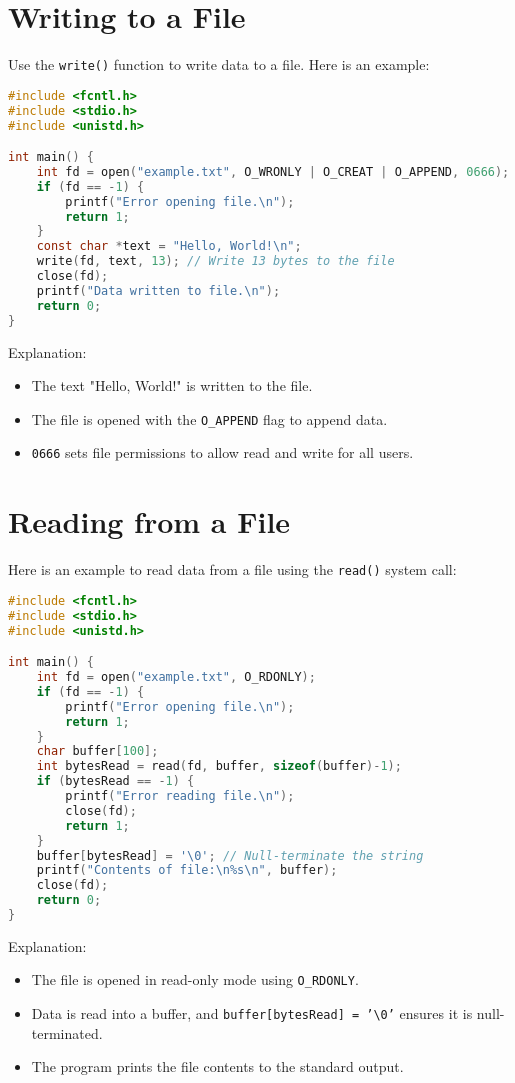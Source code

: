 \documentclass{article}
\begin{document}
\section{Writing to a File}
Use the \texttt{write()} function to write data to a file. Here is an example:
\begin{lstlisting}[language=C]
#include <fcntl.h>
#include <stdio.h>
#include <unistd.h>

int main() {
    int fd = open("example.txt", O_WRONLY | O_CREAT | O_APPEND, 0666);
    if (fd == -1) {
        printf("Error opening file.\n");
        return 1;
    }
    const char *text = "Hello, World!\n";
    write(fd, text, 13); // Write 13 bytes to the file
    close(fd);
    printf("Data written to file.\n");
    return 0;
}
\end{lstlisting}
Explanation:
\begin{itemize}
    \item The text "Hello, World!\n" is written to the file.
    \item The file is opened with the \texttt{O\_APPEND} flag to append data.
    \item \texttt{0666} sets file permissions to allow read and write for all users.
\end{itemize}

\section{Reading from a File}
Here is an example to read data from a file using the \texttt{read()} system call:
\begin{lstlisting}[language=C]
#include <fcntl.h>
#include <stdio.h>
#include <unistd.h>

int main() {
    int fd = open("example.txt", O_RDONLY);
    if (fd == -1) {
        printf("Error opening file.\n");
        return 1;
    }
    char buffer[100];
    int bytesRead = read(fd, buffer, sizeof(buffer)-1);
    if (bytesRead == -1) {
        printf("Error reading file.\n");
        close(fd);
        return 1;
    }
    buffer[bytesRead] = '\0'; // Null-terminate the string
    printf("Contents of file:\n%s\n", buffer);
    close(fd);
    return 0;
}
\end{lstlisting}
Explanation:
\begin{itemize}
    \item The file is opened in read-only mode using \texttt{O\_RDONLY}.
    \item Data is read into a buffer, and \texttt{buffer[bytesRead] = '\textbackslash0'} ensures it is null-terminated.
    \item The program prints the file contents to the standard output.
\end{itemize}
\end{document}
